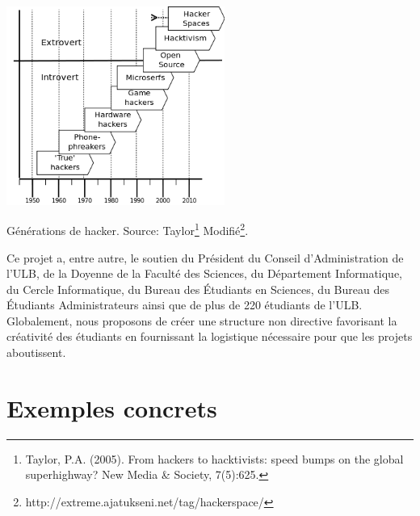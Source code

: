 \documentclass{article}
\begin{document}
\begin{center}
\includegraphics[height=65mm]{hacker-generations-divided.png}

Générations de hacker. Source: Taylor\footnote{Taylor,  P.A. (2005). From hackers to hacktivists: speed bumps on the global  superhighway? New Media \& Society, 7(5):625.} Modifié\footnote{http://extreme.ajatukseni.net/tag/hackerspace/}.
\end{center}

Ce projet a, entre autre, le soutien du Président du Conseil d'Administration de l'ULB, de la Doyenne de la Faculté des Sciences, du Département Informatique, du Cercle Informatique, du Bureau des Étudiants en Sciences, du Bureau des Étudiants Administrateurs ainsi que de plus de 220 étudiants de l'ULB. Globalement, nous proposons de créer une structure non directive favorisant la créativité des étudiants en fournissant la logistique nécessaire pour que les projets aboutissent.

\section{Exemples concrets}
\end{document}
